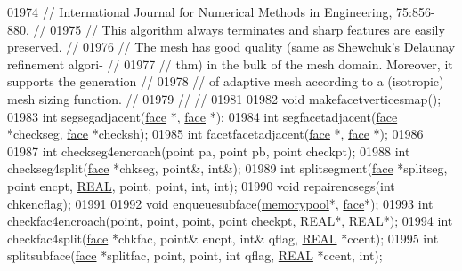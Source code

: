 \begin{DoxyCode}
01974 \textcolor{comment}{// International Journal for Numerical Methods in Engineering, 75:856-880.   //}
01975 \textcolor{comment}{// This algorithm always terminates and sharp features are easily preserved. //}
01976 \textcolor{comment}{// The mesh has good quality (same as Shewchuk's Delaunay refinement algori- //}
01977 \textcolor{comment}{// thm) in the bulk of the mesh domain. Moreover, it supports the generation //}
01978 \textcolor{comment}{// of adaptive mesh according to a (isotropic) mesh sizing function.         //   }
01979 \textcolor{comment}{//                                                                           //}
01981 \textcolor{comment}{}
01982   \textcolor{keywordtype}{void} makefacetverticesmap();
01983   \textcolor{keywordtype}{int} segsegadjacent(\hyperlink{classtetgenmesh_1_1face}{face} *, \hyperlink{classtetgenmesh_1_1face}{face} *);
01984   \textcolor{keywordtype}{int} segfacetadjacent(\hyperlink{classtetgenmesh_1_1face}{face} *checkseg, \hyperlink{classtetgenmesh_1_1face}{face} *checksh);
01985   \textcolor{keywordtype}{int} facetfacetadjacent(\hyperlink{classtetgenmesh_1_1face}{face} *, \hyperlink{classtetgenmesh_1_1face}{face} *);
01986 
01987   \textcolor{keywordtype}{int} checkseg4encroach(point pa, point pb, point checkpt);
01988   \textcolor{keywordtype}{int} checkseg4split(\hyperlink{classtetgenmesh_1_1face}{face} *chkseg, point&, \textcolor{keywordtype}{int}&);
01989   \textcolor{keywordtype}{int} splitsegment(\hyperlink{classtetgenmesh_1_1face}{face} *splitseg, point encpt, \hyperlink{tetgen_8h_a4b654506f18b8bfd61ad2a29a7e38c25}{REAL}, point, point, \textcolor{keywordtype}{int}, \textcolor{keywordtype}{int});
01990   \textcolor{keywordtype}{void} repairencsegs(\textcolor{keywordtype}{int} chkencflag);
01991 
01992   \textcolor{keywordtype}{void} enqueuesubface(\hyperlink{classtetgenmesh_1_1memorypool}{memorypool}*, \hyperlink{classtetgenmesh_1_1face}{face}*);
01993   \textcolor{keywordtype}{int} checkfac4encroach(point, point, point, point checkpt, \hyperlink{tetgen_8h_a4b654506f18b8bfd61ad2a29a7e38c25}{REAL}*, \hyperlink{tetgen_8h_a4b654506f18b8bfd61ad2a29a7e38c25}{REAL}*);
01994   \textcolor{keywordtype}{int} checkfac4split(\hyperlink{classtetgenmesh_1_1face}{face} *chkfac, point& encpt, \textcolor{keywordtype}{int}& qflag, \hyperlink{tetgen_8h_a4b654506f18b8bfd61ad2a29a7e38c25}{REAL} *ccent);
01995   \textcolor{keywordtype}{int} splitsubface(\hyperlink{classtetgenmesh_1_1face}{face} *splitfac, point, point, \textcolor{keywordtype}{int} qflag, \hyperlink{tetgen_8h_a4b654506f18b8bfd61ad2a29a7e38c25}{REAL} *ccent, \textcolor{keywordtype}{int});

\end{DoxyCode}
